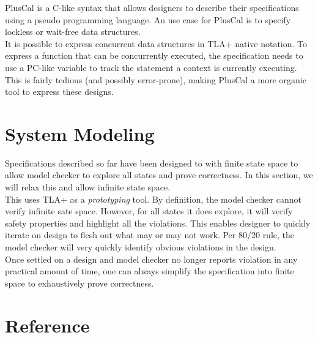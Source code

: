 \documentclass{kdp}
\begin{document}
PlusCal is a C-like syntax that allows designers to describe their
specifications using a pseudo programming language. An use case for PlusCal is
to specify lockless or wait-free data structures.\\

It is possible to express concurrent data structures in TLA+ native notation. To
express a function that can be concurrently executed, the specification needs to
use a PC-like variable to track the statement a context is currently executing.
This is fairly tedious (and possibly error-prone), making PlusCal a more organic
tool to express these designs. 





\part{System Modeling}

Specifications described so far have been designed to with finite state space to
allow model checker to explore all states and prove correctness. In this
section, we will relax this and allow infinite state space.\\

This uses TLA+ as a \textit{prototyping} tool. By definition, the model checker
cannot verify infinite sate space. However, for all states it does explore, it
will verify safety properties and highlight all the violations. This enables
designer to quickly iterate on design to flesh out what may or may not work. Per
80/20 rule, the model checker will very quickly identify obvious violations in
the design.\\

Once settled on a design and model checker no longer reports violation in any 
practical amount of time, one can always simplify the specification into finite
space to exhaustively prove correctness. 







\part{Reference}










\end{document}
